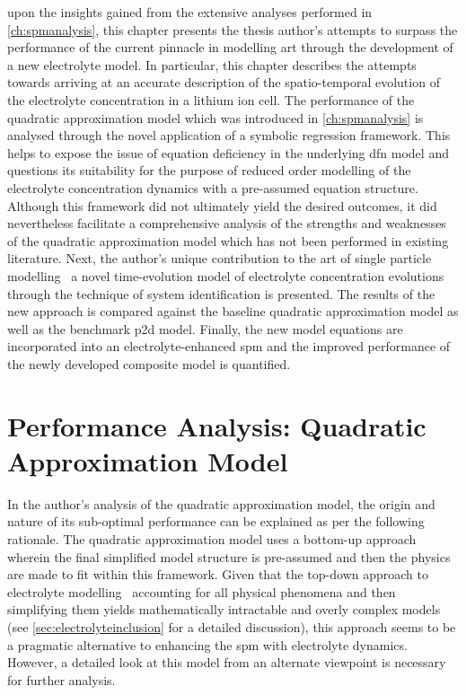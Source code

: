 \bigskip

  upon  the insights  gained  from  the extensive  analyses
performed in  \cref{ch:spmanalysis}, this  chapter presents the  thesis author's
attempts to  surpass the performance  of the  current pinnacle in  modelling art
through the development of a new  electrolyte model. In particular, this chapter
describes  the attempts  towards  arriving  at an  accurate  description of  the
spatio-temporal  evolution of  the electrolyte  concentration in  a lithium  ion
cell. The performance of the  quadratic approximation model which was introduced
in \cref{ch:spmanalysis} is analysed through the novel application of a symbolic
regression framework. This  helps to expose the issue of  equation deficiency in
the underlying \gls{dfn} model and questions  its suitability for the purpose of
reduced  order  modelling  of  the electrolyte  concentration  dynamics  with  a
pre-assumed equation structure. Although this framework did not ultimately yield
the desired outcomes, it did nevertheless facilitate a comprehensive analysis of
the  strengths  and  weaknesses  of  the  quadratic  approximation  model  which
has  not  been performed  in  existing  literature.  Next, the  author's  unique
contribution to the art of single particle modelling \viz~a novel time-evolution
model of  electrolyte concentration evolutions  through the technique  of system
identification  is  presented. The  results  of  the  new approach  is  compared
against  the baseline  quadratic approximation  model as  well as  the benchmark
\gls{p2d}  model. Finally,  the new  model  equations are  incorporated into  an
electrolyte-enhanced  \gls{spm}  and  the  improved  performance  of  the  newly
developed composite model is quantified.

\section{Performance Analysis: Quadratic Approximation Model}\label{sec:symbolicregression}

In the  author's analysis of the  quadratic approximation model, the  origin and
nature of  its sub-optimal  performance can  be explained  as per  the following
rationale. The quadratic  approximation model uses a  bottom-up approach wherein
the final  simplified model structure  is pre-assumed  and then the  physics are
made  to  fit  within  this  framework. Given  that  the  top-down  approach  to
electrolyte  modelling \ie~accounting for  all physical  phenomena and  then
simplifying  them yields  mathematically intractable  and overly  complex models
(see \cref{sec:electrolyteinclusion} for  a detailed discussion),  this approach
seems to be a pragmatic alternative  to enhancing the \gls{spm} with electrolyte
dynamics. However, a detailed look at  this model from an alternate viewpoint is
necessary for further analysis.

